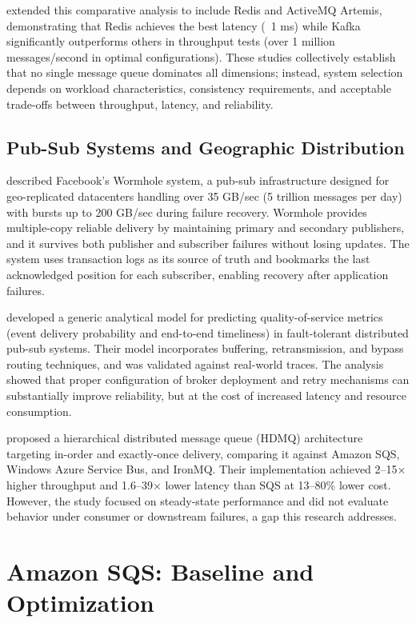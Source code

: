 \citet{Maharjan2023Benchmarking} extended this comparative analysis to include Redis and ActiveMQ Artemis, demonstrating that Redis achieves the best latency (~1 ms) while Kafka significantly outperforms others in throughput tests (over 1 million messages/second in optimal configurations). These studies collectively establish that no single message queue dominates all dimensions; instead, system selection depends on workload characteristics, consistency requirements, and acceptable trade-offs between throughput, latency, and reliability.

\subsection{Pub-Sub Systems and Geographic Distribution}

\citet{Sharma2016Wormhole} described Facebook's Wormhole system, a pub-sub infrastructure designed for geo-replicated datacenters handling over 35 GB/sec (5 trillion messages per day) with bursts up to 200 GB/sec during failure recovery. Wormhole provides multiple-copy reliable delivery by maintaining primary and secondary publishers, and it survives both publisher and subscriber failures without losing updates. The system uses transaction logs as its source of truth and bookmarks the last acknowledged position for each subscriber, enabling recovery after application failures.

\citet{Pongthawornkamol2013ReliabilityPubSub} developed a generic analytical model for predicting quality-of-service metrics (event delivery probability and end-to-end timeliness) in fault-tolerant distributed pub-sub systems. Their model incorporates buffering, retransmission, and bypass routing techniques, and was validated against real-world traces. The analysis showed that proper configuration of broker deployment and retry mechanisms can substantially improve reliability, but at the cost of increased latency and resource consumption.

\citet{Shirolkar2014HDMQ} proposed a hierarchical distributed message queue (HDMQ) architecture targeting in-order and exactly-once delivery, comparing it against Amazon SQS, Windows Azure Service Bus, and IronMQ. Their implementation achieved 2–15× higher throughput and 1.6–39× lower latency than SQS at 13–80\% lower cost. However, the study focused on steady-state performance and did not evaluate behavior under consumer or downstream failures, a gap this research addresses.

\section{Amazon SQS: Baseline and Optimization}

